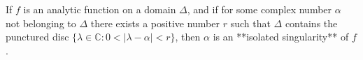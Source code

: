 If $f$ is an analytic function on a domain $\Delta$, and if for some complex number $\alpha$ not belonging to $\Delta$ there exists a positive number $r$ such that $\Delta$ contains the punctured disc $\{\lambda \in \mathbb{C} : 0 < |\lambda - \alpha| < r\}$, then $\alpha$ is an **isolated singularity** of $f$.
